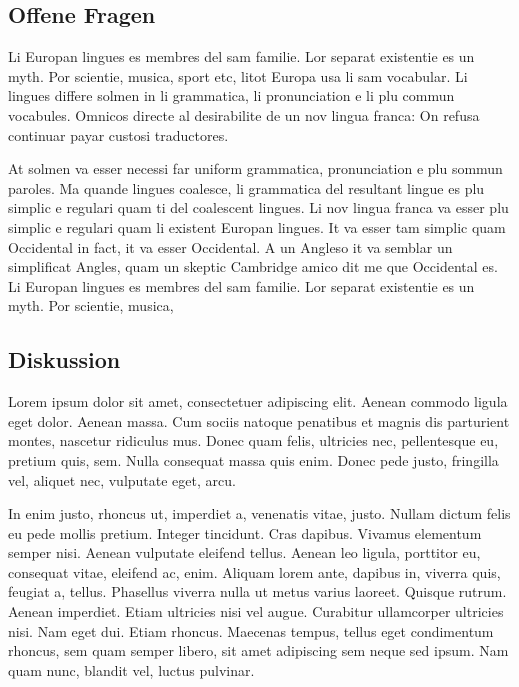 \documentclass[paper=a4,fontsize=12pt,ngerman]{scrartcl}
\begin{document}
\subsection{Offene Fragen}
Li Europan lingues es membres del sam familie. Lor separat existentie es un 
myth. Por scientie, musica, sport etc, litot Europa usa li sam vocabular. Li 
lingues differe solmen in li grammatica, li pronunciation e li plu commun 
vocabules. Omnicos directe al desirabilite de un nov lingua franca: On refusa 
continuar payar custosi traductores.

At solmen va esser necessi far uniform grammatica, pronunciation e plu sommun 
paroles. Ma quande lingues coalesce, li grammatica del resultant lingue es 
plu simplic e regulari quam ti del coalescent lingues. Li nov lingua franca 
va esser plu simplic e regulari quam li existent Europan lingues. It va esser 
tam simplic quam Occidental in fact, it va esser Occidental. A un Angleso it 
va semblar un simplificat Angles, quam un skeptic Cambridge amico dit me que 
Occidental es. Li Europan lingues es membres del sam familie. Lor separat 
existentie es un myth. Por scientie, musica,

\subsection{Diskussion}
Lorem ipsum dolor sit amet, consectetuer adipiscing elit. Aenean commodo 
ligula eget dolor. Aenean massa. Cum sociis natoque penatibus et magnis dis 
parturient montes, nascetur ridiculus mus. Donec quam felis, ultricies nec, 
pellentesque eu, pretium quis, sem. Nulla consequat massa quis enim. Donec 
pede justo, fringilla vel, aliquet nec, vulputate eget, arcu.

In enim justo, rhoncus ut, imperdiet a, venenatis vitae, justo. Nullam dictum 
felis eu pede mollis pretium. Integer tincidunt. Cras dapibus. Vivamus 
elementum semper nisi. Aenean vulputate eleifend tellus. Aenean leo ligula, 
porttitor eu, consequat vitae, eleifend ac, enim. Aliquam lorem ante, dapibus 
in, viverra quis, feugiat a, tellus. Phasellus viverra nulla ut metus varius 
laoreet. Quisque rutrum. Aenean imperdiet. Etiam ultricies nisi vel augue. 
Curabitur ullamcorper ultricies nisi. Nam eget dui. Etiam rhoncus. Maecenas 
tempus, tellus eget condimentum rhoncus, sem quam semper libero, sit amet 
adipiscing sem neque sed ipsum. Nam quam nunc, blandit vel, luctus pulvinar.

\clearpage
\renewcommand\refname{Literaturverzeichnis}


\end{document}
